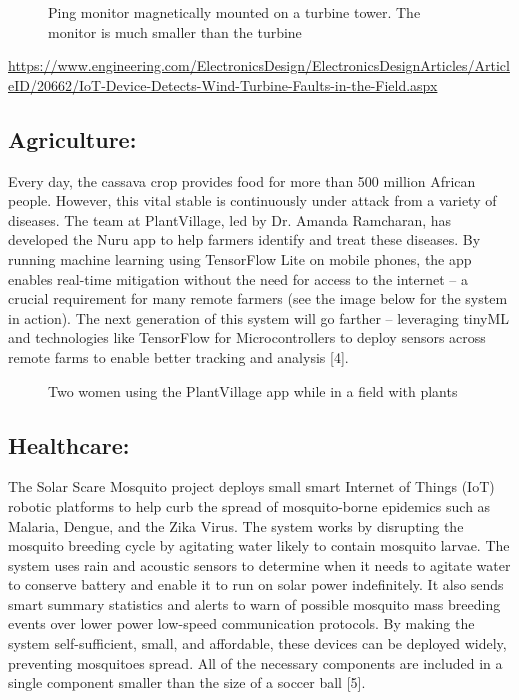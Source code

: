 \begin{figure}
    \caption{Ping monitor magnetically mounted on a turbine tower. The monitor is much smaller than the turbine}
\end{figure}  

\url{https://www.engineering.com/ElectronicsDesign/ElectronicsDesignArticles/ArticleID/20662/IoT-Device-Detects-Wind-Turbine-Faults-in-the-Field.aspx}

\subsection{Agriculture:}

Every day, the cassava crop provides food for more than 500 million African people. However, this vital stable is continuously under attack from a variety of diseases. The team at PlantVillage, led by Dr. Amanda Ramcharan, has developed the Nuru app to help farmers identify and treat these diseases. By running machine learning using TensorFlow Lite on mobile phones, the app enables real-time mitigation without the need for access to the internet -- a crucial requirement for many remote farmers (see the image below for the system in action). The next generation of this system will go farther -- leveraging tinyML and technologies like TensorFlow for Microcontrollers to deploy sensors across remote farms to enable better tracking and analysis [4].

\begin{figure}
    \caption{Two women using the PlantVillage app while in a field with plants}
\end{figure}  



\subsection{Healthcare:}

The Solar Scare Mosquito project deploys small smart Internet of Things (IoT) robotic platforms to help curb the spread of mosquito-borne epidemics such as Malaria, Dengue, and the Zika Virus. The system works by disrupting the mosquito breeding cycle by agitating water likely to contain mosquito larvae. The system uses rain and acoustic sensors to determine when it needs to agitate water to conserve battery and enable it to run on solar power indefinitely. It also sends smart summary statistics and alerts to warn of possible mosquito mass breeding events over lower power low-speed communication protocols. By making the system self-sufficient, small, and affordable, these devices can be deployed widely, preventing mosquitoes spread. All of the necessary components are included in a single component smaller than the size of a soccer ball [5].

